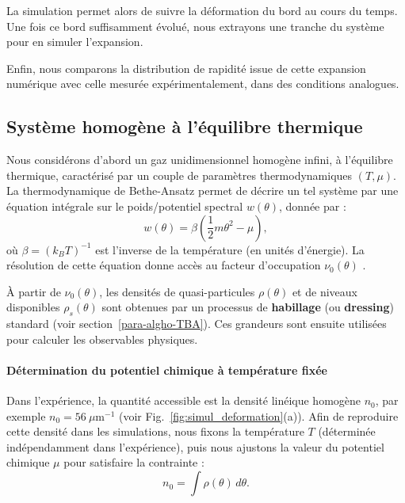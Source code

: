 La simulation permet alors de suivre la déformation du bord au cours du temps. Une fois ce bord suffisamment évolué, nous extrayons une tranche du système pour en simuler l’expansion.

Enfin, nous comparons la distribution de rapidité issue de cette expansion numérique avec celle mesurée expérimentalement, dans des conditions analogues.


\subsection{Système homogène à l'équilibre thermique}

Nous considérons d’abord un gaz unidimensionnel homogène infini, à l’équilibre thermique, caractérisé par un couple de paramètres thermodynamiques $(T, \mu)$. La thermodynamique de Bethe-Ansatz permet de décrire un tel système par une équation intégrale sur le poids/potentiel spectral $w(\theta)$, donnée par :
\begin{equation}
w(\theta) = \beta\left(\frac{1}{2}m\theta^2 - \mu\right),
\end{equation}
où $\beta = (k_B T)^{-1}$ est l’inverse de la température (en unités d’énergie). La résolution de cette équation donne accès au facteur d’occupation $\nu_0(\theta)$ .

À partir de $\nu_0(\theta)$, les densités de quasi-particules $\rho(\theta)$ et de niveaux disponibles $\rho_s(\theta)$ sont obtenues par un processus de {\bf habillage} (ou {\bf dressing}) standard (voir section~\ref{para-algho-TBA}). Ces grandeurs sont ensuite utilisées pour calculer les observables physiques.



\paragraph{Détermination du potentiel chimique à température fixée}

Dans l’expérience, la quantité accessible est la densité linéique homogène $n_0$, par exemple $n_0 = 56~\mu\mathrm{m}^{-1}$ (voir Fig.~\ref{fig:simul_deformation}(a)). Afin de reproduire cette densité dans les simulations, nous fixons la température $T$ (déterminée indépendamment dans l’expérience), puis nous ajustons la valeur du potentiel chimique $\mu$ pour satisfaire la contrainte :
\begin{equation}
n_0 = \int \rho(\theta)\, d\theta.
\end{equation}

